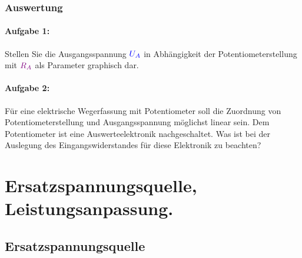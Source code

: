 \documentclass[11pt,a4paper,titlepage,parskip=half]{scrreprt}
\begin{document}
        \subsection{Auswertung}
          \subsubsection{Aufgabe 1:} Stellen Sie die Ausgangsspannung $\textcolor{blue}{U_A}$ in Abhängigkeit der Potentiometerstellung
          mit $\textcolor{violet}{R_A}$ als Parameter graphisch dar.
          \subsubsection{Aufgabe 2:}  Für eine elektrische Wegerfassung mit Potentiometer soll die Zuordnung von Potentiometerstellung und Ausgangsspannung möglichst linear sein. Dem Potentiometer ist eine Auswerteelektronik nachgeschaltet. Was ist bei der Auslegung des Eingangswiderstandes für diese Elektronik zu beachten?

    \chapter{Ersatzspannungsquelle, Leistungsanpassung.}


        \section{Ersatzspannungsquelle}
\end{document}
